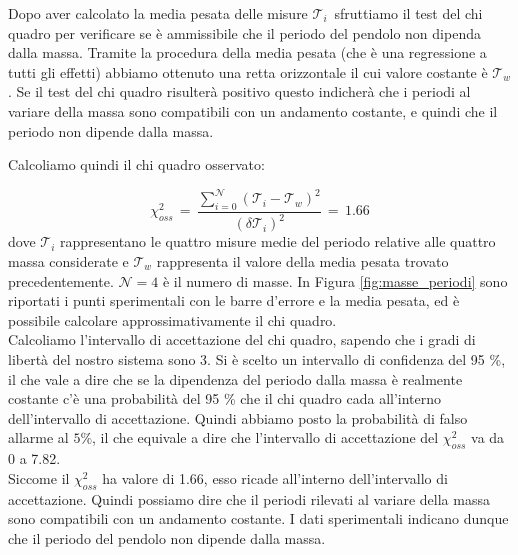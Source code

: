\label{m_chi_pesata}

Dopo aver calcolato la media pesata delle misure $\mathcal{T}_i\,$ sfruttiamo il test del chi quadro per verificare se
è ammissibile che il periodo del pendolo non dipenda dalla massa. Tramite la procedura della media pesata (che è una regressione
a tutti gli effetti) abbiamo ottenuto
una retta orizzontale il cui valore costante è $\mathcal{T}_w$. Se il test del chi quadro risulterà positivo questo indicherà
che i periodi al variare della massa sono compatibili con un andamento costante, e quindi che il periodo non dipende dalla massa.


%
Calcoliamo quindi il chi quadro osservato:

\begin{equation*}
	\chi_{oss}^2 \,=\, \frac{\sum_{i=0}^{\mathcal{N}} (\mathcal{T}_i - \mathcal{T}_w)^2}{(\delta \mathcal{T}_i)^2} \,=\, 1.66
\end{equation*}
%
dove $\mathcal{T}_i$ rappresentano le quattro misure medie del periodo relative alle quattro massa considerate e $\mathcal{T}_w$ rappresenta il valore della media pesata trovato precedentemente. $\mathcal{N} = 4$ è il numero di masse. In Figura \ref{fig:masse_periodi} sono
riportati i punti sperimentali con le barre d'errore e la media pesata, ed è possibile calcolare approssimativamente il chi quadro. \\

Calcoliamo l'intervallo di accettazione del chi quadro, sapendo che i gradi di libertà del nostro sistema sono 3.
Si è scelto un intervallo di confidenza del 95 \%, il che vale a dire che se la dipendenza del periodo dalla massa è realmente costante
c'è una probabilità del 95 \% che il chi quadro cada all'interno dell'intervallo di accettazione.
Quindi abbiamo posto la probabilità di falso allarme al $5\%$, il che equivale a dire che l'intervallo di accettazione del $\chi_{oss}^2$ va da 0 a 7.82.\\
Siccome il $\chi_{oss}^2$ ha valore di 1.66, esso ricade all'interno dell'intervallo di accettazione.
Quindi possiamo dire che il periodi rilevati
al variare della massa sono compatibili con un andamento costante. I dati sperimentali indicano dunque che
il periodo del pendolo non dipende dalla massa. 

